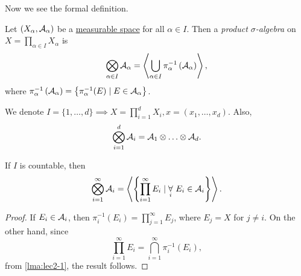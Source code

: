 Now we see the formal definition.
\begin{definition}\label{def:product-sigma-algebra}
	Let \((X_\alpha , \mathcal{\MakeUppercase{a}} _\alpha )\) be a \hyperref[def:measurable-space]{measurable space} for all \(\alpha \in I\).
	Then a \emph{product \(\sigma\)-algebra} on \(X = \prod\limits_{\alpha \in I} X_\alpha \) is
	\[
		\bigotimes_{\alpha \in I}\mathcal{\MakeUppercase{a}} _\alpha = \left< \bigcup\limits_{\alpha \in I} \pi ^{-1} _{\alpha }\left(\mathcal{\MakeUppercase{a}} _\alpha \right)  \right>,
	\]
	where \(\pi ^{-1} _\alpha \left(\mathcal{\MakeUppercase{a}} _\alpha \right) = \left\{\pi ^{-1} _\alpha (E) \mid E\in \mathcal{\MakeUppercase{a}} _\alpha \right\}\).
\end{definition}

\begin{notation}
	We denote \(I = \{1, \ldots , d\} \implies X = \prod\limits_{i=1}^{d} X_{i}, x = (x_1, \ldots , x_d )\). Also,
	\[
		\bigotimes_{i = 1}^d \mathcal{\MakeUppercase{a}} _{i} = \mathcal{\MakeUppercase{a}} _1\otimes \ldots \otimes \mathcal{\MakeUppercase{a}} _d.
	\]
\end{notation}

\begin{lemma}
	If \(I\) is countable, then
	\[
		\bigotimes_{i = 1}^{\infty}\mathcal{\MakeUppercase{a}} _{i} = \left< \left\{\prod\limits_{i = 1}^{\infty} E_{i} \mid \underset{i}{\forall }\ E_{i}\in \mathcal{\MakeUppercase{a}} _{i}\right\} \right>.
	\]
\end{lemma}
\begin{proof}
	If \(E_i \in \mathcal{\MakeUppercase{a}} _{i}\), then \(\pi ^{-1} _{i} (E_{i} ) = \prod\limits_{j=1}^{\infty } E_{j}\), where \(E_{j} = X\) for \(j\neq i\). On the other hand, since
	\[
		\prod\limits_{i=1}^{\infty } E_{i} = \bigcap\limits_{i=1}^{\infty } \pi ^{-1} _{i} (E_{i} ),
	\]
	from \autoref{lma:lec2-1}, the result follows.
\end{proof}